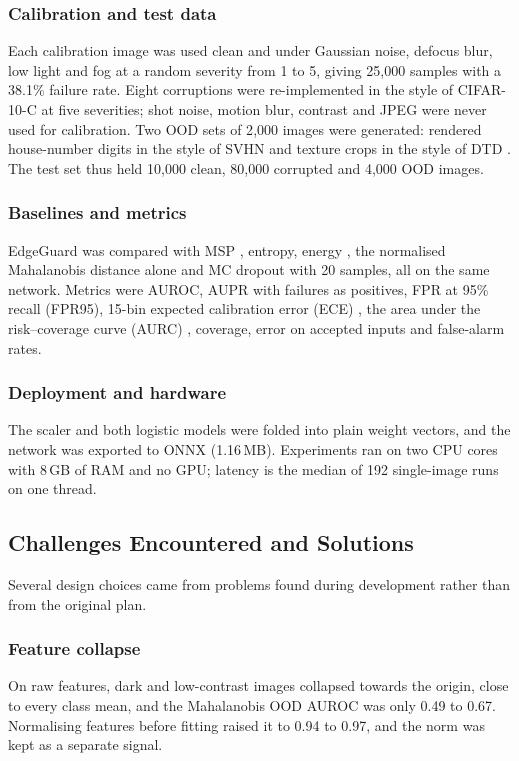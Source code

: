 \documentclass[conference]{IEEEtran}
\begin{document}
\subsubsection{Calibration and test data}
Each calibration image was used clean and under Gaussian noise, defocus blur, low light and fog at a random severity from 1 to 5, giving 25{,}000 samples with a 38.1\% failure rate. Eight corruptions were re-implemented in the style of CIFAR-10-C \cite{hendrycks2019corruptions} at five severities; shot noise, motion blur, contrast and JPEG were never used for calibration. Two OOD sets of 2{,}000 images were generated: rendered house-number digits in the style of SVHN \cite{netzer2011svhn} and texture crops in the style of DTD \cite{cimpoi2014dtd}. The test set thus held 10{,}000 clean, 80{,}000 corrupted and 4{,}000 OOD images.

\subsubsection{Baselines and metrics}
EdgeGuard was compared with MSP \cite{hendrycks2017baseline}, entropy, energy \cite{liu2020energy}, the normalised Mahalanobis distance alone \cite{lee2018mahalanobis} and MC dropout \cite{gal2016dropout} with 20 samples, all on the same network. Metrics were AUROC, AUPR with failures as positives, FPR at 95\% recall (FPR95), 15-bin expected calibration error (ECE) \cite{guo2017calibration}, the area under the risk--coverage curve (AURC) \cite{geifman2017selective}, coverage, error on accepted inputs and false-alarm rates.

\subsubsection{Deployment and hardware}
The scaler and both logistic models were folded into plain weight vectors, and the network was exported to ONNX (1.16\,MB). Experiments ran on two CPU cores with 8\,GB of RAM and no GPU; latency is the median of 192 single-image runs on one thread.

\subsection{Challenges Encountered and Solutions}

Several design choices came from problems found during development rather than from the original plan.

\subsubsection{Feature collapse}
On raw features, dark and low-contrast images collapsed towards the origin, close to every class mean, and the Mahalanobis OOD AUROC was only 0.49 to 0.67. Normalising features before fitting raised it to 0.94 to 0.97, and the norm was kept as a separate signal.
\end{document}
